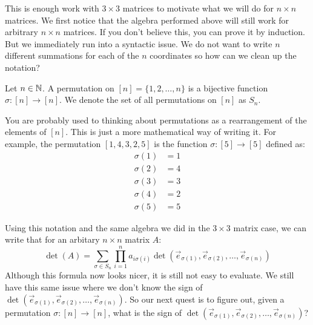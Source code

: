 This is enough work with $3\times 3$ matrices to motivate what we will do for $n\times n$ matrices. We first notice that the algebra performed above will still work for arbitrary $n\times n$ matrices. If you don't believe this, you can prove it by induction. But we immediately run into a syntactic issue. We do not want to write $n$ different summations for each of the $n$ coordinates so how can we clean up the notation?
\begin{definition}
    Let $n\in\mathbb{N}$. A permutation on $[n]=\{1,2,\dots,n\}$ is a bijective function $\sigma:[n]\to [n]$. We denote the set of all permutations on $[n]$ as $S_n$.
\end{definition}
\begin{remark}
    You are probably used to thinking about permutations as a rearrangement of the elements of $[n]$. This is just a more mathematical way of writing it. For example, the permutation $[1,4,3,2,5]$ is the function $\sigma:[5]\to[5]$ defined as:
    \begin{align*}
        \sigma(1)&=1\\
        \sigma(2)&=4\\
        \sigma(3)&=3\\
        \sigma(4)&=2\\
        \sigma(5)&=5
    \end{align*}
\end{remark}
Using this notation and the same algebra we did in the $3\times 3$ matrix case, we can write that for an arbitary $n\times n$ matrix $A$:
$$\det(A)=\sum_{\sigma\in S_n}\prod_{i=1}^na_{i\sigma(i)}\det(\vec{e}_{\sigma(1)},\vec{e}_{\sigma(2)},\dots,\vec{e}_{\sigma(n)})$$
Although this formula now looks nicer, it is still not easy to evaluate. We still have this same issue where we don't know the sign of $\det(\vec{e}_{\sigma(1)},\vec{e}_{\sigma(2)},\dots,\vec{e}_{\sigma(n)})$. So our next quest is to figure out, given a permutation $\sigma:[n]\to[n]$, what is the sign of $\det(\vec{e}_{\sigma(1)},\vec{e}_{\sigma(2)},\dots,\vec{e}_{\sigma(n)})$?

